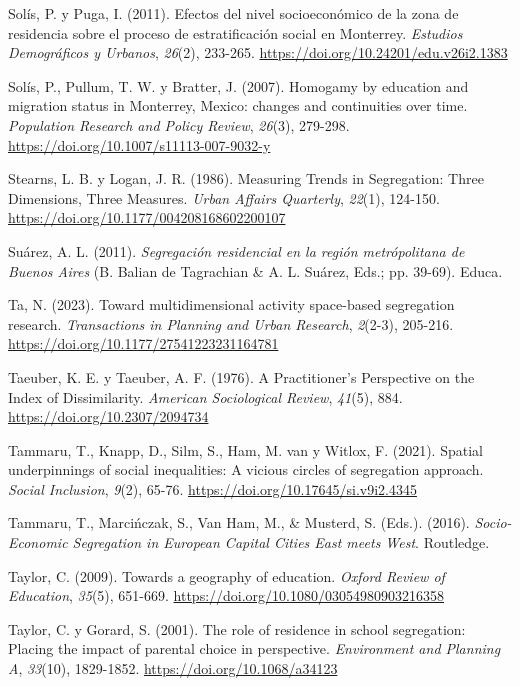 \documentclass[
  spanish,
  a4paper,%
  chapterprefix=true,%
  DIV=calc,%
  twoside]{scrbook}%
\newlength{\cslhangindent}
\newenvironment{CSLReferences}[2] %
 {\begin{list}{}{%
  \setlength{\itemindent}{0pt}
  \setlength{\leftmargin}{0pt}
  \setlength{\parsep}{0pt}
  \ifodd #1
   \setlength{\leftmargin}{\cslhangindent}
   \setlength{\itemindent}{-1\cslhangindent}
  \fi
  \setlength{\itemsep}{#2\baselineskip}}}
 {\end{list}}
\begin{document}
\begin{CSLReferences}{1}{0}
Solís, P. y Puga, I. (2011). Efectos del nivel socioeconómico de la zona de residencia sobre el proceso de estratificación social en Monterrey. \emph{Estudios Demográficos y Urbanos}, \emph{26}(2), 233-265. \url{https://doi.org/10.24201/edu.v26i2.1383}

Solís, P., Pullum, T. W. y Bratter, J. (2007). Homogamy by education and migration status in Monterrey, Mexico: changes and continuities over time. \emph{Population Research and Policy Review}, \emph{26}(3), 279-298. \url{https://doi.org/10.1007/s11113-007-9032-y}

Stearns, L. B. y Logan, J. R. (1986). Measuring Trends in Segregation: Three Dimensions, Three Measures. \emph{Urban Affairs Quarterly}, \emph{22}(1), 124-150. \url{https://doi.org/10.1177/004208168602200107}

Suárez, A. L. (2011). \emph{Segregación residencial en la región metrópolitana de Buenos Aires} (B. Balian de Tagrachian \& A. L. Suárez, Eds.; pp. 39-69). Educa.

Ta, N. (2023). Toward multidimensional activity space-based segregation research. \emph{Transactions in Planning and Urban Research}, \emph{2}(2-3), 205-216. \url{https://doi.org/10.1177/27541223231164781}

Taeuber, K. E. y Taeuber, A. F. (1976). A Practitioner's Perspective on the Index of Dissimilarity. \emph{American Sociological Review}, \emph{41}(5), 884. \url{https://doi.org/10.2307/2094734}

Tammaru, T., Knapp, D., Silm, S., Ham, M. van y Witlox, F. (2021). Spatial underpinnings of social inequalities: A vicious circles of segregation approach. \emph{Social Inclusion}, \emph{9}(2), 65-76. \url{https://doi.org/10.17645/si.v9i2.4345}

Tammaru, T., Marcińczak, S., Van Ham, M., \& Musterd, S. (Eds.). (2016). \emph{Socio-Economic Segregation in European Capital Cities East meets West}. Routledge.

Taylor, C. (2009). Towards a geography of education. \emph{Oxford Review of Education}, \emph{35}(5), 651-669. \url{https://doi.org/10.1080/03054980903216358}

Taylor, C. y Gorard, S. (2001). The role of residence in school segregation: Placing the impact of parental choice in perspective. \emph{Environment and Planning A}, \emph{33}(10), 1829-1852. \url{https://doi.org/10.1068/a34123}


\end{CSLReferences}
\end{document}

